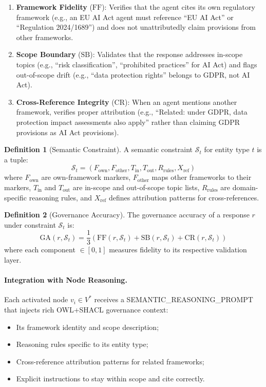 \documentclass[a4paper,11pt]{article}
\theoremstyle{definition}
\newtheorem{definition}{Definition}[section]
\begin{document}
\begin{enumerate}
\item \textbf{Framework Fidelity} ($\mathrm{FF}$): Verifies that the agent cites its own regulatory framework (e.g., an EU AI Act agent must reference ``EU AI Act'' or ``Regulation 2024/1689'') and does not unattributedly claim provisions from other frameworks.

\item \textbf{Scope Boundary} ($\mathrm{SB}$): Validates that the response addresses in-scope topics (e.g., ``risk classification'', ``prohibited practices'' for AI Act) and flags out-of-scope drift (e.g., ``data protection rights'' belongs to GDPR, not AI Act).

\item \textbf{Cross-Reference Integrity} ($\mathrm{CR}$): When an agent mentions another framework, verifies proper attribution (e.g., ``Related: under GDPR, data protection impact assessments also apply'' rather than claiming GDPR provisions as AI Act provisions).
\end{enumerate}

\begin{definition}[Semantic Constraint]
A semantic constraint $\mathcal{S}_t$ for entity type $t$ is a tuple:
\[
\mathcal{S}_t = (F_{\mathrm{own}}, F_{\mathrm{other}}, T_{\mathrm{in}}, T_{\mathrm{out}}, R_{\mathrm{rules}}, X_{\mathrm{ref}})
\]
where $F_{\mathrm{own}}$ are own-framework markers, $F_{\mathrm{other}}$ maps other frameworks to their markers, $T_{\mathrm{in}}$ and $T_{\mathrm{out}}$ are in-scope and out-of-scope topic lists, $R_{\mathrm{rules}}$ are domain-specific reasoning rules, and $X_{\mathrm{ref}}$ defines attribution patterns for cross-references.
\end{definition}

\begin{definition}[Governance Accuracy]
\label{def:gov_accuracy}
The governance accuracy of a response $r$ under constraint $\mathcal{S}_t$ is:
\[
\mathrm{GA}(r, \mathcal{S}_t) = \frac{1}{3}\left(\mathrm{FF}(r, \mathcal{S}_t) + \mathrm{SB}(r, \mathcal{S}_t) + \mathrm{CR}(r, \mathcal{S}_t)\right)
\]
where each component $\in [0, 1]$ measures fidelity to its respective validation layer.
\end{definition}

\paragraph{Integration with Node Reasoning.}
Each activated node $v_i \in V^*$ receives a \textsc{SEMANTIC\_REASONING\_PROMPT} that injects rich OWL+SHACL governance context:
\begin{itemize}
\item Its framework identity and scope description;
\item Reasoning rules specific to its entity type;
\item Cross-reference attribution patterns for related frameworks;
\item Explicit instructions to stay within scope and cite correctly.
\end{itemize}
\end{document}
